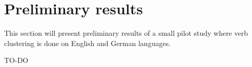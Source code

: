 \section{Preliminary results}

This section will present preliminary results of a small pilot study where verb clustering is done on English and German languages.

TO-DO